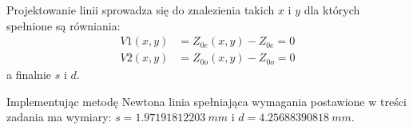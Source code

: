 \documentclass[rep.tex]{subfiles}
\begin{document}
Projektowanie linii sprowadza się do znalezienia takich $x$ i $y$ dla których spełnione są równiania:
\begin{align}
  V1(x, y) &= Z_{0e}(x, y) - Z_{0e} = 0 \\
  V2(x, y) &= Z_{0o}(x, y) - Z_{0o} = 0
\end{align}
a finalnie $s$ i $d$.

Implementując metodę Newtona linia spełniająca wymagania postawione w treści zadania ma wymiary: $s = 1.97191812203~mm$ i $d = 4.25688390818~mm$.
\end{document}
